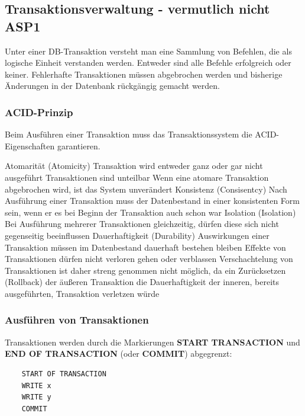 \documentclass[10pt]{article}
\begin{document}
\subsection{Transaktionsverwaltung - vermutlich nicht ASP1}
Unter einer DB-Transaktion versteht man eine Sammlung von Befehlen, die als logische Einheit verstanden werden.
Entweder sind alle Befehle erfolgreich oder keiner.
Fehlerhafte Transaktionen müssen abgebrochen werden und bisherige Änderungen in der Datenbank rückgängig gemacht werden.

\subsubsection{ACID-Prinzip}
Beim Ausführen einer Transaktion muss das Transaktionssystem die ACID-Eigenschaften garantieren.

\begin{outline}
    \1 Atomarität (Atomicity)
        \2 Transaktion wird entweder ganz oder gar nicht ausgeführt
        \2 Transaktionen sind unteilbar
        \2 Wenn eine atomare Transaktion abgebrochen wird, ist das System unverändert
    \1 Konsistenz (Consisentcy)
        \2 Nach Ausführung einer Transaktion muss der Datenbestand in einer konsistenten Form sein, wenn er es bei Beginn der Transaktion auch schon war
    \1 Isolation (Isolation)
        \2 Bei Ausführung mehrerer Transaktionen gleichzeitig, dürfen diese sich nicht gegenseitig beeinflussen
    \1 Dauerhaftigkeit (Durability)
        \2 Auswirkungen einer Transaktion müssen im Datenbestand dauerhaft bestehen bleiben
        \2 Effekte von Transaktionen dürfen nicht verloren gehen oder verblassen
        \2 Verschachtelung von Transaktionen ist daher streng genommen nicht möglich, da ein Zurücksetzen (Rollback) der äußeren Transaktion die Dauerhaftigkeit der inneren, bereits ausgeführten, Transaktion verletzen würde
\end{outline}

\subsubsection{Ausführen von Transaktionen}

Transaktionen werden durch die Markierungen \textbf{START TRANSACTION} und \textbf{END OF TRANSACTION} (oder \textbf{COMMIT}) abgegrenzt:

\begin{lstlisting}
    START OF TRANSACTION
    WRITE x
    WRITE y
    COMMIT
\end{lstlisting}
\end{document}
